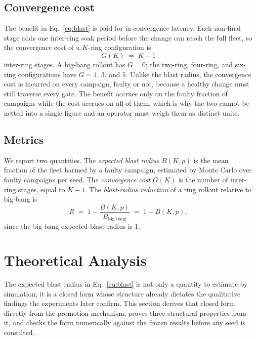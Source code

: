 \documentclass[journal]{IEEEtran}
\begin{document}
\subsection{Convergence cost}
The benefit in Eq.~\eqref{eq:blast} is paid for in convergence latency. Each non-final stage adds one
inter-ring soak period before the change can reach the full fleet, so the convergence cost of a
$K$-ring configuration is
\begin{equation}
G(K) \;=\; K - 1
\label{eq:cost}
\end{equation}
inter-ring stages. A big-bang rollout has $G = 0$; the two-ring, four-ring, and six-ring
configurations have $G = 1$, $3$, and $5$. Unlike the blast radius, the convergence cost is incurred
on every campaign, faulty or not, because a healthy change must still traverse every gate. The
benefit accrues only on the faulty fraction of campaigns while the cost accrues on all of them, which
is why the two cannot be netted into a single figure and an operator must weigh them as distinct
units.

\subsection{Metrics}
We report two quantities. The \emph{expected blast radius} $B(K,p)$ is the mean fraction of the fleet
harmed by a faulty campaign, estimated by Monte Carlo over faulty campaigns per seed. The
\emph{convergence cost} $G(K)$ is the number of inter-ring stages, equal to $K-1$. The
\emph{blast-radius reduction} of a ring rollout relative to big-bang is
\begin{equation}
R \;=\; 1 - \frac{B(K, p)}{B_{\text{big-bang}}} \;=\; 1 - B(K, p),
\end{equation}
since the big-bang expected blast radius is $1$.

\section{Theoretical Analysis}
The expected blast radius in Eq.~\eqref{eq:blast} is not only a quantity to estimate by simulation;
it is a closed form whose structure already dictates the qualitative findings the experiments later
confirm. This section derives that closed form directly from the promotion mechanism, proves three
structural properties from it, and checks the form numerically against the frozen results before any
seed is consulted.
\end{document}
